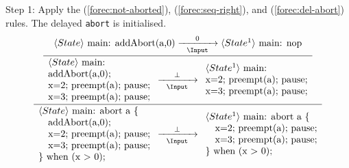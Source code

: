 \noindent
Step 1: Apply the (\ref{forec:not-aborted}), (\ref{forec:seq-right}), 
and (\ref{forec:del-abort}) rules. The delayed \verb$abort$ is initialised.
\begin{equation*}
	\frac{
		\dfrac{
				\langle State \rangle ~ \text{main: addAbort(a,0)}
					\xrightarrow[~~\Input~~]{0}
				 \langle State^1 \rangle ~ \text{main: nop}
			}{
				\begin{array}{l}
					\langle State \rangle ~ \text{main:}	\\
					\text{addAbort(a,0);}					\\
					\text{x=2; preempt(a); pause;}			\\
					\text{x=3; preempt(a); pause;}
				\end{array}
					\xrightarrow[~~\Input~~]{\bot} 
				\begin{array}{l}
					\langle State^1 \rangle ~ \text{main:}	\\
					\text{x=2; preempt(a); pause;}			\\
					\text{x=3; preempt(a); pause;}							
				\end{array}
			}
		}{
			\begin{array}{l}
				\langle State \rangle ~ \text{main: abort a \{}	\\
				\text{~~~addAbort(a,0);}						\\
				\text{~~~x=2; preempt(a); pause;}				\\
				\text{~~~x=3; preempt(a); pause;}				\\
				\text{\} when (x > 0);}
			\end{array}
				\xrightarrow[~~\Input~~]{\bot} 
			\begin{array}{l}
				\langle State^1 \rangle ~ \text{main: abort a \{}	\\
				\text{~~~x=2; preempt(a); pause;}					\\
				\text{~~~x=3; preempt(a); pause;}					\\
				\text{\} when (x > 0);}
			\end{array}
		}
\end{equation*}

